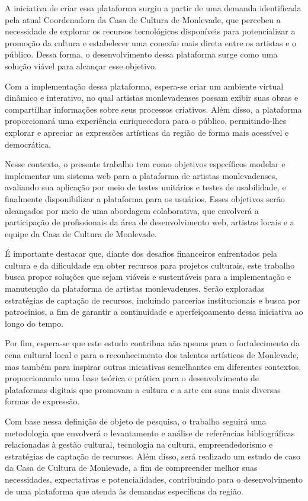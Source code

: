 A iniciativa de criar essa plataforma surgiu a partir de uma demanda identificada pela atual Coordenadora da Casa de Cultura de Monlevade, que percebeu a necessidade de explorar os recursos tecnológicos disponíveis para potencializar a promoção da cultura e estabelecer uma conexão mais direta entre os artistas e o público. Dessa forma, o desenvolvimento dessa plataforma surge como uma solução viável para alcançar esse objetivo.

Com a implementação dessa plataforma, espera-se criar um ambiente virtual dinâmico e interativo, no qual artistas monlevadenses possam exibir suas obras e compartilhar informações sobre seus processos criativos. Além disso, a plataforma proporcionará uma experiência enriquecedora para o público, permitindo-lhes explorar e apreciar as expressões artísticas da região de forma mais acessível e democrática.

Nesse contexto, o presente trabalho tem como objetivos específicos modelar e implementar um sistema web para a plataforma de artistas monlevadenses, avaliando sua aplicação por meio de testes unitários e testes de usabilidade, e finalmente disponibilizar a plataforma para os usuários. Esses objetivos serão alcançados por meio de uma abordagem colaborativa, que envolverá a participação de profissionais da área de desenvolvimento web, artistas locais e a equipe da Casa de Cultura de Monlevade.

É importante destacar que, diante dos desafios financeiros enfrentados pela cultura e da dificuldade em obter recursos para projetos culturais, este trabalho busca propor soluções que sejam viáveis e sustentáveis para a implementação e manutenção da plataforma de artistas monlevadenses. Serão exploradas estratégias de captação de recursos, incluindo parcerias institucionais e busca por patrocínios, a fim de garantir a continuidade e aperfeiçoamento dessa iniciativa ao longo do tempo.

Por fim, espera-se que este estudo contribua não apenas para o fortalecimento da cena cultural local e para o reconhecimento dos talentos artísticos de Monlevade, mas também para inspirar outras iniciativas semelhantes em diferentes contextos, proporcionando uma base teórica e prática para o desenvolvimento de plataformas digitais que promovam a cultura e a arte em suas mais diversas formas de expressão.

Com base nessa definição de objeto de pesquisa, o trabalho seguirá uma metodologia que envolverá o levantamento e análise de referências bibliográficas relacionadas à gestão cultural, tecnologia na cultura, empreendedorismo e estratégias de captação de recursos. Além disso, será realizado um estudo de caso da Casa de Cultura de Monlevade, a fim de compreender melhor suas necessidades, expectativas e potencialidades, contribuindo para o desenvolvimento de uma plataforma que atenda às demandas específicas da região.

